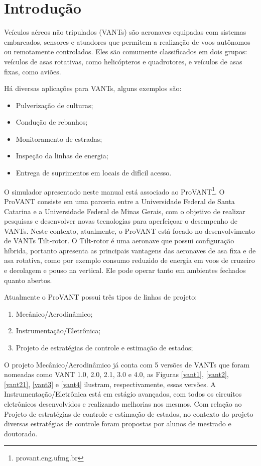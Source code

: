 \chapter{Introdução}

Veículos aéreos não tripulados (VANTs) são aeronaves equipadas com sistemas embarcados, sensores e atuadores que permitem a realização de voos autônomos ou remotamente controlados. Eles são comumente classificados em dois grupos: veículos de asas rotativas, como helicópteros e quadrotores, e veículos de asas fixas, como aviões. 

Há diversas aplicações para VANTs, alguns exemplos são:

\begin{itemize}
	\itemsep0em
	\item Pulverização de culturas;
	\item Condução de rebanhos;
	\item Monitoramento de estradas;
	\item Inspeção da linhas de energia;
	\item Entrega de suprimentos em locais de difícil acesso.
	\end{itemize}
	
O simulador apresentado neste manual está associado ao ProVANT\footnote{provant.eng.ufmg.br}. O ProVANT consiste em uma parceria entre a Universidade Federal de Santa Catarina e a Universidade Federal de Minas Gerais, com o objetivo de realizar pesquisas e desenvolver novas tecnologias para aperfeiçoar o desempenho de VANTs. Neste contexto, atualmente, o ProVANT está focado no desenvolvimento de VANTs Tilt-rotor.  O Tilt-rotor é uma aeronave que possui configuração híbrida, portanto apresenta as principais vantagens das aeronaves de asa fixa e de asa rotativa, como por exemplo consumo reduzido de energia em voos de cruzeiro e decolagem e pouso na vertical. Ele pode operar tanto em ambientes fechados quanto abertos.

Atualmente o ProVANT possui três tipos de linhas de projeto:
	\begin{enumerate}
		\item Mecânico/Aerodinâmico;
		\item Instrumentação/Eletrônica;
		\item Projeto de estratégias de controle e estimação de estados;
	\end{enumerate}

O projeto Mecânico/Aerodinâmico já conta com 5 versões de VANTs que foram nomeadas como VANT 1.0, 2.0, 2.1, 3.0 e 4.0, as Figuras \ref{vant1}, \ref{vant2}, \ref{vant21}, \ref{vant3} e \ref{vant4} ilustram, respectivamente, essas versões. A Instrumentação/Eletrônica está em estágio avançados, com todos os circuitos eletrônicos desenvolvidos e realizando melhorias nos mesmos. Com relação ao Projeto de estratégias de controle e estimação de estados, no contexto do projeto diversas estratégias de controle foram propostas por alunos de mestrado e doutorado.

